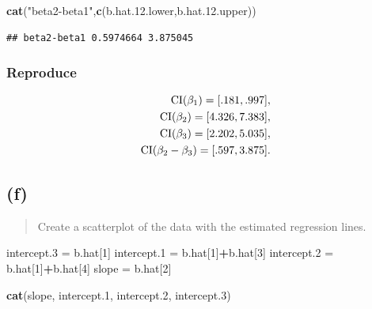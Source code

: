 \documentclass[
]{article}
\newenvironment{Shaded}{\begin{snugshade}}{\end{snugshade}}
\newcommand{\DecValTok}[1]{\textcolor[rgb]{0.00,0.00,0.81}{#1}}
\newcommand{\FloatTok}[1]{\textcolor[rgb]{0.00,0.00,0.81}{#1}}
\newcommand{\FunctionTok}[1]{\textcolor[rgb]{0.13,0.29,0.53}{\textbf{#1}}}
\newcommand{\NormalTok}[1]{#1}
\newcommand{\OtherTok}[1]{\textcolor[rgb]{0.56,0.35,0.01}{#1}}
\newcommand{\SpecialCharTok}[1]{\textcolor[rgb]{0.81,0.36,0.00}{\textbf{#1}}}
\newcommand{\StringTok}[1]{\textcolor[rgb]{0.31,0.60,0.02}{#1}}
\begin{document}
\begin{Shaded}
\begin{Highlighting}[]
\FunctionTok{cat}\NormalTok{(}\StringTok{"beta2{-}beta1"}\NormalTok{,}\FunctionTok{c}\NormalTok{(b.hat.}\FloatTok{12.}\NormalTok{lower,b.hat.}\FloatTok{12.}\NormalTok{upper))}
\end{Highlighting}
\end{Shaded}

\begin{verbatim}
## beta2-beta1 0.5974664 3.875045
\end{verbatim}

\hypertarget{reproduce-16}{%
\subsubsection{Reproduce}\label{reproduce-16}}

\begin{align*}
  \operatorname{CI}(\beta_1) = [.181,.997],\\
  \operatorname{CI}(\beta_2) = [4.326,7.383],\\
  \operatorname{CI}(\beta_3) = [2.202,5.035],\\
  \operatorname{CI}(\beta_2-\beta_3) = [.597,3.875].
\end{align*}

\hypertarget{f-2}{%
\subsection{(f)}\label{f-2}}

\begin{quote}
Create a scatterplot of the data with the estimated regression lines.
\end{quote}

\begin{Shaded}
\begin{Highlighting}[]
\NormalTok{intercept}\FloatTok{.3} \OtherTok{=}\NormalTok{ b.hat[}\DecValTok{1}\NormalTok{]}
\NormalTok{intercept}\FloatTok{.1} \OtherTok{=}\NormalTok{ b.hat[}\DecValTok{1}\NormalTok{]}\SpecialCharTok{+}\NormalTok{b.hat[}\DecValTok{3}\NormalTok{]}
\NormalTok{intercept}\FloatTok{.2} \OtherTok{=}\NormalTok{ b.hat[}\DecValTok{1}\NormalTok{]}\SpecialCharTok{+}\NormalTok{b.hat[}\DecValTok{4}\NormalTok{]}
\NormalTok{slope }\OtherTok{=}\NormalTok{ b.hat[}\DecValTok{2}\NormalTok{]}

\FunctionTok{cat}\NormalTok{(slope, intercept}\FloatTok{.1}\NormalTok{, intercept}\FloatTok{.2}\NormalTok{, intercept}\FloatTok{.3}\NormalTok{)}
\end{Highlighting}
\end{Shaded}
\end{document}
